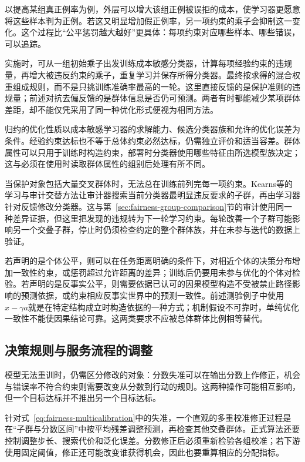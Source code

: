 以提高某组真正例率为例，外层可以增大该组正例被误拒的成本，使学习器更愿意将这些样本判为正例。若这又明显增加假正例率，另一项约束的乘子会抑制这一变化。这个过程比“公平惩罚越大越好”更具体：每项约束对应哪些样本、哪些错误，可以追踪。

实施时，可从一组初始乘子出发训练成本敏感分类器，计算每项经验约束的违规量，再增大被违反约束的乘子，重复学习并保存所得分类器。最终按求得的混合权重组成规则，而不是只挑训练准确率最高的一轮。这里直接反馈的是保护准则的违规量；前述对抗去偏反馈的是群体信息是否仍可预测。两者有时都能减少某项群体差距，却不能仅凭采用了同一种优化形式便视为相同方法。

归约的优化性质以成本敏感学习器的求解能力、候选分类器族和允许的优化误差为条件。经验约束达标也不等于总体约束必然达标，仍需独立评价和适当容差。群体属性可以只用于训练时构造约束，部署时分类器使用哪些特征由所选模型族决定；这与必须在使用时读取群体属性的组别后处理有所不同。

当保护对象包括大量交叉群体时，无法总在训练前列完每一项约束。Kearns等的学习与审计交替方法让审计器搜索当前分类器最明显违反要求的子群，再由学习器针对反馈修改分类器。这与第~\ref{sec:fairness-group-comparison}节的审计使用同一种差异证据，但这里把发现的违规转为下一轮学习约束。每轮改善一个子群可能影响另一个交叠子群，停止时仍须检查约定的整个群体族，并在未参与迭代的数据上验证。

若声明的是个体公平，则可以在任务距离明确的条件下，对相近个体的决策分布增加一致性约束，或惩罚超过允许距离的差异；训练后仍要用未参与优化的个体对检验。若声明的是反事实公平，则需要依据已认可的因果模型构造不受被禁止路径影响的预测依据，或约束相应反事实世界中的预测一致性。前述测验例子中使用$x-\gamma a$就是在特定结构成立时构造依据的一种方式；机制假设不可靠时，单纯优化一致性不能使因果结论可靠。这两类要求不应被总体群体比例相等替代。

\subsection{决策规则与服务流程的调整}
\label{sec:fairness-decision-intervention}

模型无法重训时，仍需区分修改的对象：分数失准可以在输出分数上作修正，机会与错误率不符合约束则需要改变从分数到行动的规则。这两种操作可能相互影响，但一个目标达标并不推出另一个目标达标。

针对式~\eqref{eq:fairness-multicalibration}中的失准，一个直观的多重校准修正过程是在“子群与分数区间”中按平均残差调整预测，再检查其他交叠群体。正式算法还要控制调整步长、搜索代价和泛化误差。分数修正后必须重新检验各组校准；若下游使用固定阈值，修正还可能改变谁获得机会，因此也要重算相应的分配指标。

